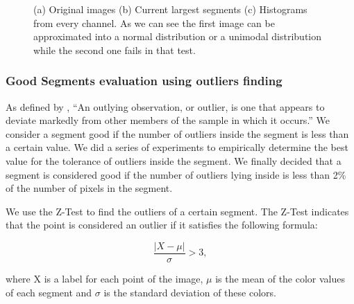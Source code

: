 \documentclass[twoside,11pt]{article}
\begin{document}
\begin{figure}[!t]
{    \label{fig:segn}
}
\caption{(a) Original images (b) Current largest segments (c) Histograms from
every
channel. As we can see the first image can be approximated into a normal distribution
or a unimodal distribution while the second one fails in that test.}
\label{fig:colorhists}
\end{figure}

\subsubsection{Good Segments evaluation using outliers finding}

As defined by \cite{grubbs-1969}, ``An outlying observation, or outlier, is one
that appears to deviate markedly from other members of the sample in which it
occurs.'' We consider a segment good if the number of outliers inside the
segment is less than a certain value. We did a series of experiments to
empirically determine the best value for the tolerance of outliers inside the
segment. We finally decided that a segment is considered good if the number of
outliers lying inside is less than 2\% of the number of pixels in the segment.

We use the Z-Test to find the outliers of a certain segment. The Z-Test
indicates that the point is considered an outlier if it satisfies the following
formula:

\[
\frac{|X - \mu|}{\sigma} > 3,
\]

where X is a label for each point of the image, $\mu$ is the mean of the color values
of each segment and $\sigma$ is the standard deviation of these colors.
\end{document}
